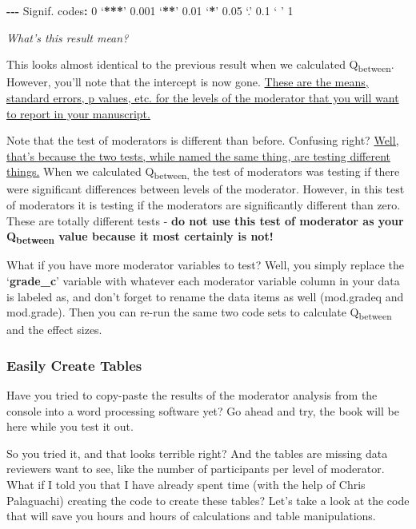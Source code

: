 \documentclass[
]{book}
\newenvironment{Shaded}{\begin{snugshade}}{\end{snugshade}}
\newcommand{\DecValTok}[1]{\textcolor[rgb]{0.00,0.00,0.81}{#1}}
\newcommand{\ErrorTok}[1]{\textcolor[rgb]{0.64,0.00,0.00}{\textbf{#1}}}
\newcommand{\FloatTok}[1]{\textcolor[rgb]{0.00,0.00,0.81}{#1}}
\newcommand{\NormalTok}[1]{#1}
\newcommand{\SpecialCharTok}[1]{\textcolor[rgb]{0.81,0.36,0.00}{\textbf{#1}}}
\begin{document}
\begin{Shaded}
\begin{Highlighting}[]
\SpecialCharTok{{-}{-}{-}}
\NormalTok{Signif. codes}\SpecialCharTok{:}  \DecValTok{0}\NormalTok{ ‘}\SpecialCharTok{**}\ErrorTok{*}\NormalTok{’ }\FloatTok{0.001}\NormalTok{ ‘}\SpecialCharTok{**}\NormalTok{’ }\FloatTok{0.01}\NormalTok{ ‘}\SpecialCharTok{*}\NormalTok{’ }\FloatTok{0.05}\NormalTok{ ‘.’ }\FloatTok{0.1}\NormalTok{ ‘ ’ }\DecValTok{1}
\end{Highlighting}
\end{Shaded}

\emph{What's this result mean?}

This looks almost identical to the previous result when we calculated Q\textsubscript{between}. However, you'll note that the intercept is now gone. \ul{These are the means, standard errors, p values, etc. for the levels of the moderator that you will want to report in your manuscript.}

Note that the test of moderators is different than before. Confusing right? \ul{Well, that's because the two tests, while named the same thing, are testing different things.} When we calculated Q\textsubscript{between,} the test of moderators was testing if there were significant differences between levels of the moderator. However, in this test of moderators it is testing if the moderators are significantly different than zero. These are totally different tests - \textbf{do not use this test of moderator as your Q\textsubscript{between} value because it most certainly is not!}

What if you have more moderator variables to test? Well, you simply replace the `\textbf{grade\_c}' variable with whatever each moderator variable column in your data is labeled as, and don't forget to rename the data items as well (mod.gradeq and mod.grade). Then you can re-run the same two code sets to calculate Q\textsubscript{between} and the effect sizes.

\hypertarget{easily-create-tables-1}{%
\subsubsection{Easily Create Tables}\label{easily-create-tables-1}}

Have you tried to copy-paste the results of the moderator analysis from the console into a word processing software yet? Go ahead and try, the book will be here while you test it out.

So you tried it, and that looks terrible right? And the tables are missing data reviewers want to see, like the number of participants per level of moderator. What if I told you that I have already spent time (with the help of Chris Palaguachi) creating the code to create these tables? Let's take a look at the code that will save you hours and hours of calculations and table manipulations.
\end{document}
